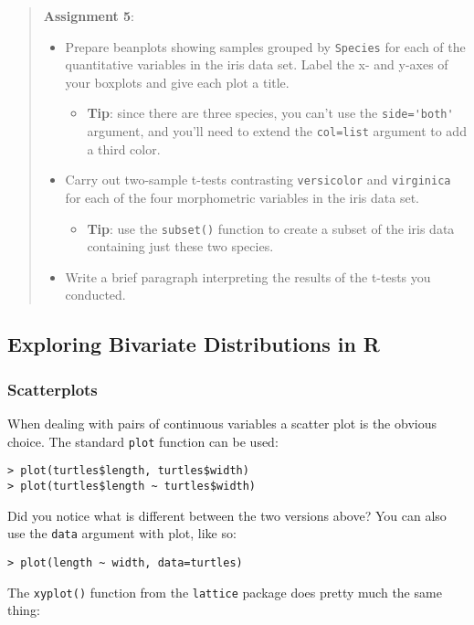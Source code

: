 \begin{quote}
\textbf{Assignment 5}:

\begin{itemize}
\item
  Prepare beanplots showing samples grouped by \lstinline!Species! for
  each of the quantitative variables in the iris data set. Label the x-
  and y-axes of your boxplots and give each plot a title.

  \begin{itemize}
  \item
    \textbf{Tip}: since there are three species, you can't use the
    \lstinline!side='both'! argument, and you'll need to extend the
    \lstinline!col=list! argument to add a third color.
  \end{itemize}
\item
  Carry out two-sample t-tests contrasting \lstinline!versicolor! and
  \lstinline!virginica! for each of the four morphometric variables in
  the iris data set.
  \begin{itemize}
  \item
    \textbf{Tip}: use the \lstinline!subset()! function to create a
    subset of the iris data containing just these two species.
  \end{itemize}
\item
  Write a brief paragraph interpreting the results of the t-tests you
  conducted.
\end{itemize}
\end{quote}
\subsection{Exploring Bivariate Distributions in R}

\subsubsection{Scatterplots}

When dealing with pairs of continuous variables a scatter plot is the
obvious choice. The standard \lstinline!plot! function can be used:

\begin{lstlisting}
> plot(turtles$length, turtles$width)
> plot(turtles$length ~ turtles$width)    
\end{lstlisting}
Did you notice what is different between the two versions above? You can
also use the \lstinline!data! argument with plot, like so:

\begin{lstlisting}
> plot(length ~ width, data=turtles)
\end{lstlisting}
The \lstinline!xyplot()! function from the \lstinline!lattice! package
does pretty much the same thing:

